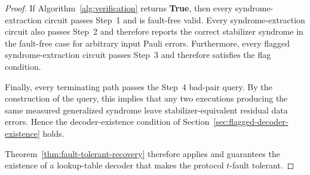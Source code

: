 \documentclass[acmsmall,screen,review,anonymous,nonacm]{acmart}
\begin{document}
\begin{proof}
If Algorithm~\ref{alg:verification} returns \textbf{True}, then every syndrome-extraction circuit passes Step~1 and is fault-free valid. Every syndrome-extraction circuit also passes Step~2 and therefore reports the correct stabilizer syndrome in the fault-free case for arbitrary input Pauli errors. Furthermore, every flagged syndrome-extraction circuit passes Step~3 and therefore satisfies the flag condition.

Finally, every terminating path passes the Step~4 bad-pair query. By the construction of the query, this implies that any two executions producing the same measured generalized syndrome leave stabilizer-equivalent residual data errors. Hence the decoder-existence condition of Section~\ref{sec:flagged-decoder-existence} holds.

Theorem~\ref{thm:fault-tolerant-recovery} therefore applies and guarantees the existence of a lookup-table decoder that makes the protocol \(t\)-fault tolerant.
\end{proof}



\end{document}
